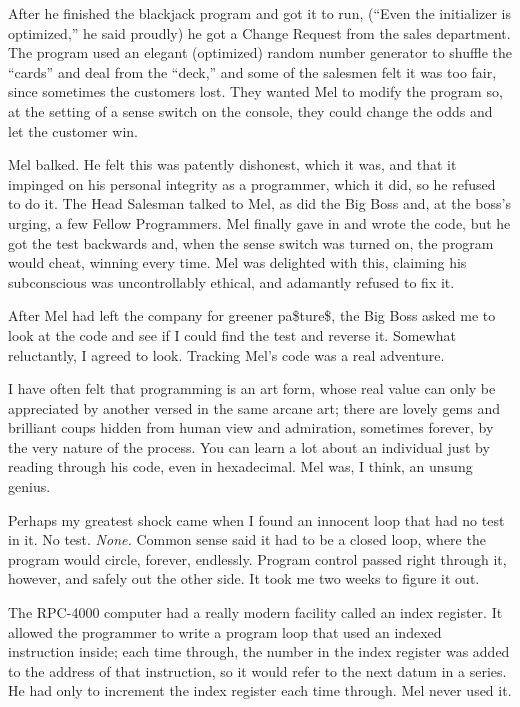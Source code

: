 \documentclass[12pt]{article}
\begin{document}
\bigskip
\noindent
After he finished the blackjack program and got it to run,
(``Even the initializer is optimized,'' he said proudly) he
got a Change Request from the sales department. The program
used an elegant (optimized) random number generator to
shuffle the ``cards'' and deal from the ``deck,'' and some of
the salesmen felt it was too fair, since sometimes the
customers lost. They wanted Mel to modify the program so,
at the setting of a sense switch on the console, they could
change the odds and let the customer win.

\bigskip
\noindent
Mel balked. He felt this was patently dishonest, which it
was, and that it impinged on his personal integrity as a
programmer, which it did, so he refused to do it. The Head
Salesman talked to Mel, as did the Big Boss and, at the
boss's urging, a few Fellow Programmers. Mel finally gave
in and wrote the code, but he got the test backwards and,
when the sense switch was turned on, the program would
cheat, winning every time. Mel was delighted with this,
claiming his subconscious was uncontrollably ethical, and
adamantly refused to fix it.

\bigskip
\noindent
After Mel had left the company for greener pa\$ture\$, the Big
Boss asked me to look at the code and see if I could find
the test and reverse it. Somewhat reluctantly, I agreed to
look. Tracking Mel's code was a real adventure.

\bigskip
\noindent
I have often felt that programming is an art form, whose
real value can only be appreciated by another versed in the
same arcane art; there are lovely gems and brilliant coups
hidden from human view and admiration, sometimes forever, by
the very nature of the process. You can learn a lot about
an individual just by reading through his code, even in
hexadecimal. Mel was, I think, an unsung genius.

\bigskip
\noindent
Perhaps my greatest shock came when I found an innocent loop
that had no test in it. No test. {\it None.} Common sense said
it had to be a closed loop, where the program would circle,
forever, endlessly. Program control passed right through
it, however, and safely out the other side. It took me two
weeks to figure it out.

\bigskip
\noindent
The RPC-4000 computer had a really modern facility called an
index register. It allowed the programmer to write a
program loop that used an indexed instruction inside; each
time through, the number in the index register was added to
the address of that instruction, so it would refer to the
next datum in a series. He had only to increment the index
register each time through. Mel never used it.
\end{document}
